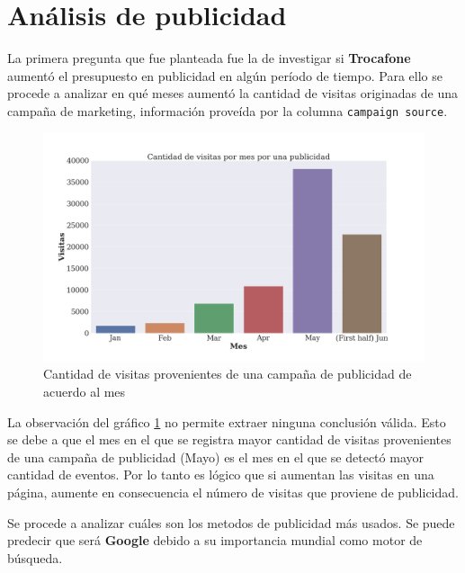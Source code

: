 \documentclass[a4paper]{article}
\begin{document}
\section{Análisis de publicidad}

La primera pregunta que fue planteada fue la de investigar si \textbf{Trocafone} aumentó el presupuesto en publicidad en algún período de tiempo. Para ello se procede a analizar en qué meses aumentó la cantidad de visitas originadas de una campaña de marketing, información proveída por la columna \texttt{campaign source}.

\begin{figure}[h!]
	\includegraphics[width=\linewidth]{figures/16-presupuesto-barplot.png}
	\caption{Cantidad de visitas provenientes de una campaña de publicidad de acuerdo al mes}
	\label{fig:publicidad}
\end{figure}

La observación del gráfico \ref{fig:publicidad} no permite extraer ninguna conclusión válida. Esto se debe a que el mes en el que se registra mayor cantidad de visitas provenientes de una campaña de publicidad (Mayo) es el mes en el que se detectó mayor cantidad de eventos. Por lo tanto es lógico que si aumentan las visitas en una página, aumente en consecuencia el número de visitas que proviene de publicidad.

Se procede a analizar cuáles son los metodos de publicidad más usados. Se puede predecir que será \textbf{Google} debido a su importancia mundial como motor de búsqueda.
\end{document}
